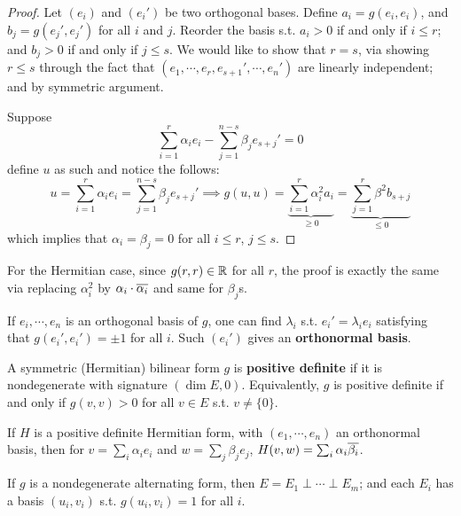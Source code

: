 \begin{proof}
    Let $(e_i)$ and $(e_i')$ be two orthogonal bases. Define $a_i = g(e_i, e_i)$, and $b_j = g(e_j', e_j')$ for all $i$ and $j$. Reorder the basis s.t. $a_i > 0$ if and only if $i \leq r$; and $b_j > 0$ if and only if $j \leq s$. We would like to show that $r = s$, via showing $r \leq s$ through the fact that $(e_1, \cdots, e_r, e_{s+1}', \cdots, e_n')$ are linearly independent; and by symmetric argument.

    Suppose
    \[
        \sum_{i=1}^r \alpha_i e_i - \sum_{j = 1}^{n-s} \beta_j e_{s+j}' = 0
    \]
    define $u$ as such and notice the follows:
    \[
        u = \sum_{i=1}^r \alpha_i e_i = \sum_{j = 1}^{n-s} \beta_j e_{s+j}' \implies g(u, u) = \underbrace{\sum_{i=1}^r \alpha_i^2 a_i}_{\geq 0} = \underbrace{\sum_{j=1}^r \beta^2 b_{s+j}}_{\leq 0}
    \]
    which implies that $\alpha_i = \beta_j = 0$ for all $i \leq r$, $j \leq s$.
\end{proof}

\begin{remark}
    For the Hermitian case, since $g(r, r) \in \mathbb{R}$ for all $r$, the proof is exactly the same via replacing $\alpha_i^2$ by $\alpha_i \cdot \overline{\alpha_i}$ and same for $\beta_j$s.
\end{remark}

\begin{remark}
    If $e_i, \cdots, e_n$ is an orthogonal basis of $g$, one can find $\lambda_i$ s.t. $e_i' = \lambda_i e_i$ satisfying that $g(e_i', e_i') = \pm 1$ for all $i$. Such $(e_i')$ gives an \textbf{orthonormal basis}.
\end{remark}

\begin{definition}
    A symmetric (Hermitian) bilinear form $g$ is \textbf{positive definite} if it is nondegenerate with signature $(\dim E, 0)$. Equivalently, $g$ is positive definite if and only if $g(v, v) > 0$ for all $v \in E$ s.t. $v \neq \{0\}$.
\end{definition}

\begin{example}
    If $H$ is a positive definite Hermitian form, with $(e_1, \cdots, e_n)$ an orthonormal basis, then for $v = \sum_i \alpha_i e_i$ and $w = \sum_j \beta_j e_j$, $H(v, w) = \sum_i \alpha_i \overline{\beta_i}$.
\end{example}

\begin{proposition}
    If $g$ is a nondegenerate alternating form, then $E = E_1 \perp \cdots \perp E_m$; and each $E_i$ has a basis $(u_i, v_i)$ s.t. $g(u_i, v_i) = 1$ for all $i$. 
\end{proposition}

